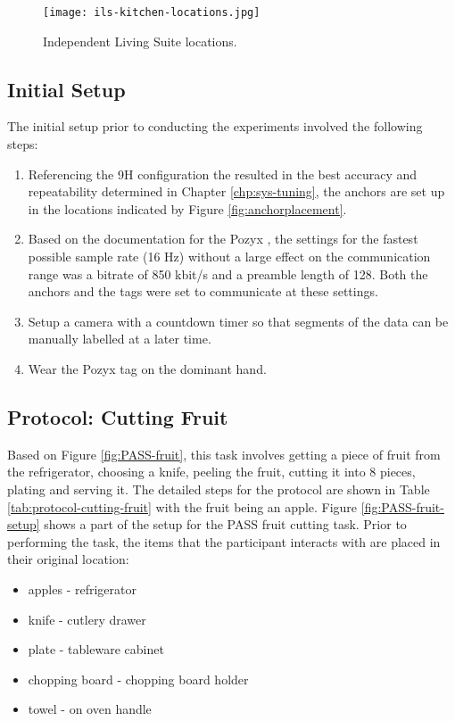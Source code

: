 \begin{figure}[ht]
    \centering
    \texttt{[image: ils-kitchen-locations.jpg]}
    \caption{Independent Living Suite locations.}
    \label{fig:ils-item-locs}
\end{figure}


\subsection{Initial Setup}
The initial setup prior to conducting the experiments involved the following steps:

\begin{enumerate}
    \item Referencing the 9H configuration the resulted in the best accuracy and repeatability determined in Chapter \ref{chp:sys-tuning}, the anchors are set up in the locations indicated by Figure \ref{fig:anchorplacement}.
    \item Based on the documentation for the Pozyx \cite{pozyx_configuration_nodate}, the settings for the fastest possible sample rate (16 Hz) without a large effect on the communication range was a bitrate of 850 kbit/s and a preamble length of 128. Both the anchors and the tags were set to communicate at these settings.
    \item Setup a camera with a countdown timer so that segments of the data can be manually labelled at a later time.
    \item Wear the Pozyx tag on the dominant hand.
\end{enumerate}

\subsection{Protocol: Cutting Fruit}
Based on Figure \ref{fig:PASS-fruit}, this task involves getting a piece of fruit from the refrigerator, choosing a knife, peeling the fruit, cutting it into 8 pieces, plating and serving it. The detailed steps for the protocol are shown in Table \ref{tab:protocol-cutting-fruit} with the fruit being an apple. Figure \ref{fig:PASS-fruit-setup} shows a part of the setup for the PASS fruit cutting task. Prior to performing the task, the items that the participant interacts with are placed in their original location:

\begin{itemize}
    \item apples - refrigerator
    \item knife - cutlery drawer
    \item plate - tableware cabinet
    \item chopping board - chopping board holder
    \item towel - on oven handle
\end{itemize}

